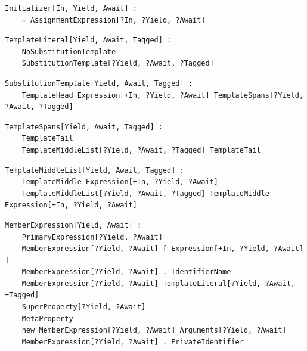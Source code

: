 \noindent\textbf{\texttt{}}\par
\begin{lstlisting}
Initializer[In, Yield, Await] :
    = AssignmentExpression[?In, ?Yield, ?Await]
\end{lstlisting}

\noindent\textbf{\texttt{}}\par
\begin{lstlisting}
TemplateLiteral[Yield, Await, Tagged] :
    NoSubstitutionTemplate
    SubstitutionTemplate[?Yield, ?Await, ?Tagged]
\end{lstlisting}

\noindent\textbf{\texttt{}}\par
\begin{lstlisting}
SubstitutionTemplate[Yield, Await, Tagged] :
    TemplateHead Expression[+In, ?Yield, ?Await] TemplateSpans[?Yield, ?Await, ?Tagged]
\end{lstlisting}

\noindent\textbf{\texttt{}}\par
\begin{lstlisting}
TemplateSpans[Yield, Await, Tagged] :
    TemplateTail
    TemplateMiddleList[?Yield, ?Await, ?Tagged] TemplateTail
\end{lstlisting}

\noindent\textbf{\texttt{}}\par
\begin{lstlisting}
TemplateMiddleList[Yield, Await, Tagged] :
    TemplateMiddle Expression[+In, ?Yield, ?Await]
    TemplateMiddleList[?Yield, ?Await, ?Tagged] TemplateMiddle Expression[+In, ?Yield, ?Await]
\end{lstlisting}

\noindent\textbf{\texttt{}}\par
\begin{lstlisting}
MemberExpression[Yield, Await] :
    PrimaryExpression[?Yield, ?Await]
    MemberExpression[?Yield, ?Await] [ Expression[+In, ?Yield, ?Await] ]
    MemberExpression[?Yield, ?Await] . IdentifierName
    MemberExpression[?Yield, ?Await] TemplateLiteral[?Yield, ?Await, +Tagged]
    SuperProperty[?Yield, ?Await]
    MetaProperty
    new MemberExpression[?Yield, ?Await] Arguments[?Yield, ?Await]
    MemberExpression[?Yield, ?Await] . PrivateIdentifier
\end{lstlisting}

